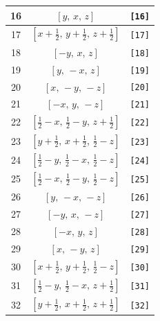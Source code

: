 \documentclass[fleqn,8pt]{jsarticle}
\begin{document}
\begin{longtable}{ccc}
16 & $\left[ y,\, x,\, z \right]$ & {\tt [16]} \\ \hline
17 & $\left[ x + \frac{1}{2},\, y + \frac{1}{2},\, z + \frac{1}{2} \right]$ & {\tt [17]} \\ \hline
18 & $\left[ - y,\, x,\, z \right]$ & {\tt [18]} \\ \hline
19 & $\left[ y,\, - x,\, z \right]$ & {\tt [19]} \\ \hline
20 & $\left[ x,\, - y,\, - z \right]$ & {\tt [20]} \\ \hline
21 & $\left[ - x,\, y,\, - z \right]$ & {\tt [21]} \\ \hline
22 & $\left[ \frac{1}{2} - x,\, \frac{1}{2} - y,\, z + \frac{1}{2} \right]$ & {\tt [22]} \\ \hline
23 & $\left[ y + \frac{1}{2},\, x + \frac{1}{2},\, \frac{1}{2} - z \right]$ & {\tt [23]} \\ \hline
24 & $\left[ \frac{1}{2} - y,\, \frac{1}{2} - x,\, \frac{1}{2} - z \right]$ & {\tt [24]} \\ \hline
25 & $\left[ \frac{1}{2} - x,\, \frac{1}{2} - y,\, \frac{1}{2} - z \right]$ & {\tt [25]} \\ \hline
26 & $\left[ y,\, - x,\, - z \right]$ & {\tt [26]} \\ \hline
27 & $\left[ - y,\, x,\, - z \right]$ & {\tt [27]} \\ \hline
28 & $\left[ - x,\, y,\, z \right]$ & {\tt [28]} \\ \hline
29 & $\left[ x,\, - y,\, z \right]$ & {\tt [29]} \\ \hline
30 & $\left[ x + \frac{1}{2},\, y + \frac{1}{2},\, \frac{1}{2} - z \right]$ & {\tt [30]} \\ \hline
31 & $\left[ \frac{1}{2} - y,\, \frac{1}{2} - x,\, z + \frac{1}{2} \right]$ & {\tt [31]} \\ \hline
32 & $\left[ y + \frac{1}{2},\, x + \frac{1}{2},\, z + \frac{1}{2} \right]$ & {\tt [32]} \\
\end{longtable}
\end{document}
